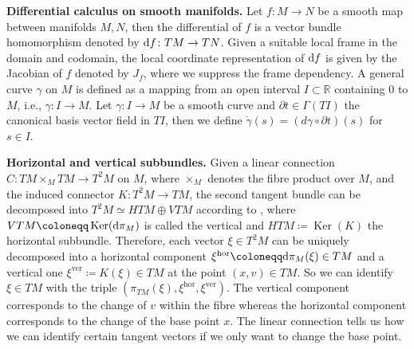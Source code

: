 \documentclass[11pt,a4paper]{article}
\theoremstyle{plain}
\theoremstyle{definition}
\newcommand{\RR}{\mathbb{R}}
\DeclareMathOperator{\Ker}{Ker}
\newcommand{\hor}{\operatorname{hor}}
\newcommand{\ver}{\operatorname{ver}}
\begin{document}
\textbf{Differential calculus on smooth manifolds.}
Let $f\colon M\to N$ be a smooth map between manifolds $M,N$, then the differential of $f$ is a vector bundle homomorphism denoted by $\textup{d}f\colon TM\to TN$. Given a suitable local frame in the domain and codomain, the local coordinate representation of $\textup{d}f$ is given by the Jacobian of $f$ denoted by $J_f$, where we suppress the frame dependency. A general curve $\gamma$ on $M$ is defined as a mapping from an open interval $I\subset\RR$ containing $0$ to $M$, i.e., $\gamma\colon I\to M$. Let $\gamma\colon I\to M$ be a smooth curve and $\partial t\in\Gamma(TI)$ the canonical basis vector field in $TI$, then we define $\dot{\gamma}(s) = (d\gamma\circ \partial t)(s)$ for $s\in I$.

\textbf{Horizontal and vertical subbundles.}
Given a linear connection $C\colon TM\times_M TM\to T^2M$ on $M$, where $\times_M$ denotes the fibre product over $M$, and the induced connector $K\colon T^2M\to TM$, the second tangent bundle can be decomposed into $T^2M\simeq HTM\oplus VTM$ according to \cite[p.~203]{michor2008}, where $VTM\coloneqq \Ker(\textup{d}\pi_{M})$ is called the vertical and $HTM\coloneqq \Ker(K)$ the horizontal subbundle. Therefore, each vector $\xi\in T^2M$ can be uniquely decomposed into a horizontal component $\xi^{\hor}\coloneqq \textup{d}\pi_M(\xi)\in TM$ and a vertical one $\xi^{\ver}\coloneqq K(\xi)\in TM$ at the point $(x, v)\in TM$.
So we can identify $\xi\in TM$ with the triple $(\pi_{TM}(\xi), \xi^{\hor}, \xi^{\ver})$. The vertical component corresponds to the change of $v$ within the fibre whereas the horizontal component corresponds to the change of the base point $x$. The linear connection tells us how we can identify certain tangent vectors if we only want to change the base point.
\end{document}
